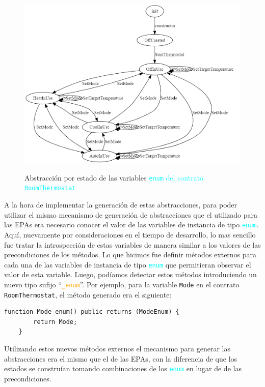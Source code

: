 \begin{figure}[H]
    \centering
    {\includegraphics[width=\textwidth]{figs/room-thermostate-abstraction.png}}
    \caption{Abstracción por estado de las variables \textcolor{cyan}{\texttt{enum} del contrato \texttt{RoomThermostat}}}
    \label{fig:room-thermostat-states}
\end{figure}

A la hora de implementar la generación de estas abstracciones, para poder utilizar el mismo mecanismo de generación de abstracciones que el utilizado para las EPAs era necesario conocer el valor de las variables de instancia de tipo \textcolor{cyan}{\texttt{enum}}.
Aquí, nuevamente por consideraciones en el tiempo de desarrollo, lo mas sencillo fue tratar la introspección de estas variables de manera similar a los valores de las precondiciones de los métodos.
Lo que hicimos fue definir métodos externos para cada una de las variables de instancia de tipo \textcolor{cyan}{\texttt{enum}} que permitieran observar el valor de esta variable.
Luego, podíamos detectar estos métodos introduciendo un nuevo tipo sufijo ``\textcolor{orange}{\texttt{\_enum}}''.
Por ejemplo, para la variable \texttt{Mode} en el contrato \texttt{RoomThermostat}, el método generado era el siguiente:

\begin{lstlisting}[language=Solidity]
    function Mode_enum() public returns (ModeEnum) {
        return Mode;
    }
\end{lstlisting}

Utilizando estos nuevos métodos externos el mecanismo para generar las abstracciones era el mismo que el de las EPAs, con la diferencia de que los estados se construían tomando combinaciones de los \textcolor{cyan}{\texttt{enum}} en lugar de de las precondiciones.
